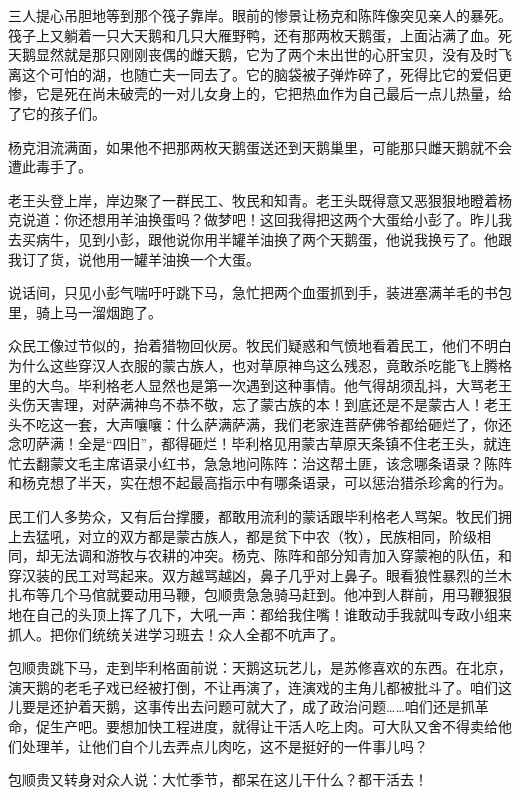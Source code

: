 \par 三人提心吊胆地等到那个筏子靠岸。眼前的惨景让杨克和陈阵像突见亲人的暴死。筏子上又躺着一只大天鹅和几只大雁野鸭，还有那两枚天鹅蛋，上面沾满了血。死天鹅显然就是那只刚刚丧偶的雌天鹅，它为了两个未出世的心肝宝贝，没有及时飞离这个可怕的湖，也随亡夫一同去了。它的脑袋被子弹炸碎了，死得比它的爱侣更惨，它是死在尚未破壳的一对儿女身上的，它把热血作为自己最后一点儿热量，给了它的孩子们。
\par 杨克泪流满面，如果他不把那两枚天鹅蛋送还到天鹅巢里，可能那只雌天鹅就不会遭此毒手了。
\par 老王头登上岸，岸边聚了一群民工、牧民和知青。老王头既得意又恶狠狠地瞪着杨克说道：你还想用羊油换蛋吗？做梦吧！这回我得把这两个大蛋给小彭了。昨儿我去买病牛，见到小彭，跟他说你用半罐羊油换了两个天鹅蛋，他说我换亏了。他跟我订了货，说他用一罐羊油换一个大蛋。
\par 说话间，只见小彭气喘吁吁跳下马，急忙把两个血蛋抓到手，装进塞满羊毛的书包里，骑上马一溜烟跑了。
\par 众民工像过节似的，抬着猎物回伙房。牧民们疑惑和气愤地看着民工，他们不明白为什么这些穿汉人衣服的蒙古族人，也对草原神鸟这么残忍，竟敢杀吃能飞上腾格里的大鸟。毕利格老人显然也是第一次遇到这种事情。他气得胡须乱抖，大骂老王头伤天害理，对萨满神鸟不恭不敬，忘了蒙古族的本！到底还是不是蒙古人！老王头不吃这一套，大声嚷嚷：什么萨满萨满，我们老家连菩萨佛爷都给砸烂了，你还念叨萨满！全是“四旧”，都得砸烂！毕利格见用蒙古草原天条镇不住老王头，就连忙去翻蒙文毛主席语录小红书，急急地问陈阵：治这帮土匪，该念哪条语录？陈阵和杨克想了半天，实在想不起最高指示中有哪条语录，可以惩治猎杀珍禽的行为。
\par 民工们人多势众，又有后台撑腰，都敢用流利的蒙话跟毕利格老人骂架。牧民们拥上去猛吼，对立的双方都是蒙古族人，都是贫下中农（牧），民族相同，阶级相同，却无法调和游牧与农耕的冲突。杨克、陈阵和部分知青加入穿蒙袍的队伍，和穿汉装的民工对骂起来。双方越骂越凶，鼻子几乎对上鼻子。眼看狼性暴烈的兰木扎布等几个马倌就要动用马鞭，包顺贵急急骑马赶到。他冲到人群前，用马鞭狠狠地在自己的头顶上挥了几下，大吼一声：都给我住嘴！谁敢动手我就叫专政小组来抓人。把你们统统关进学习班去！众人全都不吭声了。
\par 包顺贵跳下马，走到毕利格面前说：天鹅这玩艺儿，是苏修喜欢的东西。在北京，演天鹅的老毛子戏已经被打倒，不让再演了，连演戏的主角儿都被批斗了。咱们这儿要是还护着天鹅，这事传出去问题可就大了，成了政治问题……咱们还是抓革命，促生产吧。要想加快工程进度，就得让干活人吃上肉。可大队又舍不得卖给他们处理羊，让他们自个儿去弄点儿肉吃，这不是挺好的一件事儿吗？
\par 包顺贵又转身对众人说：大忙季节，都呆在这儿干什么？都干活去！
